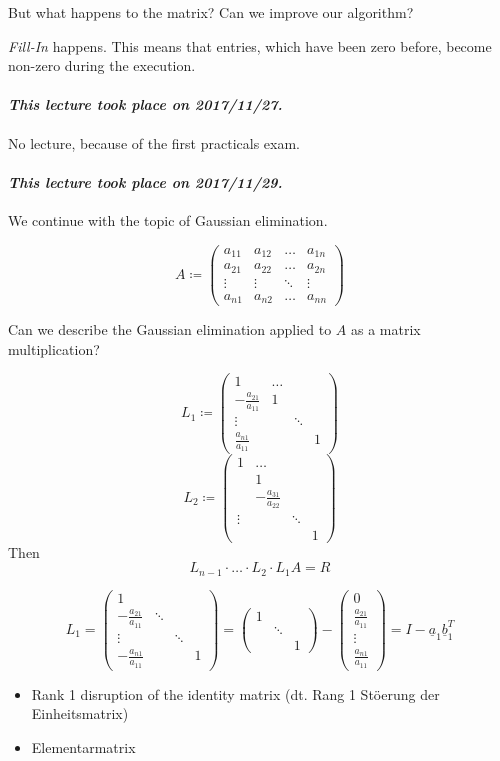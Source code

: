 \documentclass{article}
\newcommand{\dateref}[1]{\paragraph{\textit{This lecture took place on #1.}}}
\begin{document}
But what happens to the matrix? Can we improve our algorithm?

\emph{Fill-In} happens. This means that entries, which have been zero before, become non-zero during the execution.

\dateref{2017/11/27}

No lecture, because of the first practicals exam.

\dateref{2017/11/29}

We continue with the topic of Gaussian elimination.

\[
  A \coloneqq \begin{pmatrix}
    a_{11} & a_{12} & \ldots & a_{1n} \\
    a_{21} & a_{22} & \ldots & a_{2n} \\
    \vdots & \vdots & \ddots & \vdots \\
    a_{n1} & a_{n2} & \ldots & a_{nn}
  \end{pmatrix}
\]

Can we describe the Gaussian elimination applied to $A$ as a matrix multiplication?

\[
  L_1 \coloneqq \begin{pmatrix}
    1 & \ldots & & \\
    -\frac{a_{21}}{a_{11}} & 1 & & \\
    \vdots & & \ddots & \\
    \frac{a_{n1}}{a_{11}} & & & 1
  \end{pmatrix}
\]\[
  L_2 \coloneqq \begin{pmatrix}
    1 & \ldots & & \\
      & 1 & & \\
      & -\frac{a_{31}}{a_{22}} & & \\
    \vdots & & \ddots & \\
      & & & 1
  \end{pmatrix}
\]
Then
\[ L_{n-1} \cdot \ldots \cdot L_2 \cdot L_1 A = R \]

\[
  L_1 = \begin{pmatrix}
    1 & & & \\
    -\frac{a_{21}}{a_{11}} & \ddots & & \\
    \vdots &  & \ddots & \\
    -\frac{a_{n1}}{a_{11}} & & & 1
  \end{pmatrix}
  = \begin{pmatrix}
    1 & & \\
      & \ddots & \\
      & & 1
  \end{pmatrix}
  - \begin{pmatrix}
    0 \\ \frac{a_{21}}{a_{11}} \\ \vdots \\ \frac{a_{n1}}{a_{11}}
  \end{pmatrix}
  = I - \underline{a}_1 \underline{b}_1^T
\]
\begin{itemize}
  \item Rank 1 disruption of the identity matrix (dt. Rang 1 St\"oerung der Einheitsmatrix)
  \item Elementarmatrix
\end{itemize}
\end{document}
